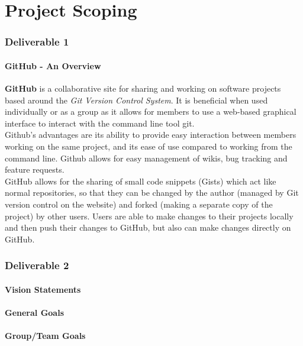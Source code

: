 \documentclass[12pt]{article}
\begin{document}
\part{Project Scoping}
\setcounter{section}{1}
\setcounter{subsection}{0}
\section*{Deliverable 1}
\subsection{GitHub - An Overview}
\textbf{GitHub} is a collaborative site for sharing and working on software projects based around the \textit{Git Version Control System}. It is beneficial when used individually or as a group as it allows for members to use a web-based graphical interface to interact with the command line tool git.\\ 

\noindent Github's advantages are its ability to provide easy interaction between members working on the same project, and its ease of use compared to working from the command line. Github allows for easy management of wikis, bug tracking and feature requests.\\

\noindent GitHub allows for the sharing of small code snippets (Gists) which act like normal repositories, so that they can be changed by the author (managed by Git version control on the website) and forked (making a separate copy of the project) by other users. Users are able to make changes to their projects locally and then push their changes to GitHub, but also can make changes directly on GitHub.

\vfill
\setcounter{section}{2}
\setcounter{subsection}{0}
\section*{Deliverable 2}
\subsection{Vision Statements}
\subsection{General Goals}
\subsection{Group/Team Goals}
\end{document}
